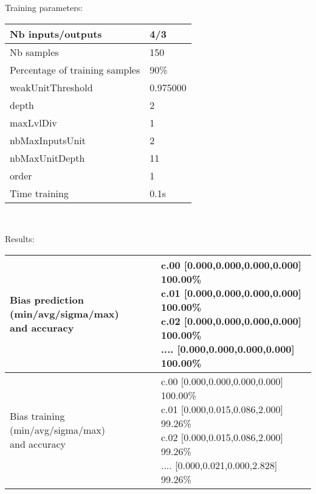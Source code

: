 Training parameters:\\
\begin{center}
\begin{tabular}{|l|l|}
\hline
Nb inputs/outputs&4/3\\
\hline
Nb samples&150\\
\hline
Percentage of training samples&90\%\\
\hline
weakUnitThreshold&0.975000\\
\hline
depth&2\\
\hline
maxLvlDiv&1\\
\hline
nbMaxInputsUnit&2\\
\hline
nbMaxUnitDepth&11\\
\hline
order&1\\
\hline
Time training&0.1s\\
\hline
\end{tabular}\\
\end{center}\newline
Results:
\begin{center}
\begin{tabular}{|l|l|}
\hline
\makecell{Bias prediction (min/avg/sigma/max)\\and accuracy}&\makecell{c.00 [0.000,0.000,0.000,0.000] 100.00\%\\
c.01 [0.000,0.000,0.000,0.000] 100.00\%\\
c.02 [0.000,0.000,0.000,0.000] 100.00\%\\
.... [0.000,0.000,0.000,0.000] 100.00\%\\
}\\

\hline
\makecell{Bias training (min/avg/sigma/max)\\and accuracy}&\makecell{c.00 [0.000,0.000,0.000,0.000] 100.00\%\\
c.01 [0.000,0.015,0.086,2.000] 99.26\%\\
c.02 [0.000,0.015,0.086,2.000] 99.26\%\\
.... [0.000,0.021,0.000,2.828] 99.26\%\\
}\\
\hline
\end{tabular}\
\end{center}
